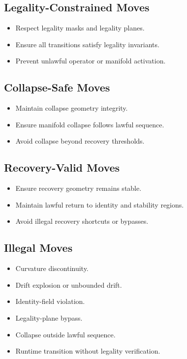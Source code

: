\subsection{Legality-Constrained Moves}
\begin{itemize}
    \item Respect legality masks and legality planes.
    \item Ensure all transitions satisfy legality invariants.
    \item Prevent unlawful operator or manifold activation.
\end{itemize}

\subsection{Collapse-Safe Moves}
\begin{itemize}
    \item Maintain collapse geometry integrity.
    \item Ensure manifold collapse follows lawful sequence.
    \item Avoid collapse beyond recovery thresholds.
\end{itemize}

\subsection{Recovery-Valid Moves}
\begin{itemize}
    \item Ensure recovery geometry remains stable.
    \item Maintain lawful return to identity and stability regions.
    \item Avoid illegal recovery shortcuts or bypasses.
\end{itemize}

\subsection{Illegal Moves}
\begin{itemize}
    \item Curvature discontinuity.
    \item Drift explosion or unbounded drift.
    \item Identity-field violation.
    \item Legality-plane bypass.
    \item Collapse outside lawful sequence.
    \item Runtime transition without legality verification.
\end{itemize}
